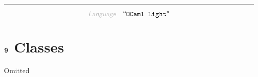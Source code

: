 

\begin{center}
\rule{3in}{0.4pt}
\end{center}

\begin{displaymath}
\KEY{Language} \quad \STRING{OCaml Light}
\end{displaymath}

\section{$\SECT{9}$ Classes}\hypertarget{SectionNumber:9}{}\label{SectionNumber:9}

Omitted



